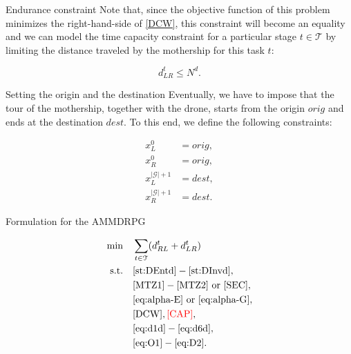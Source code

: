 \documentclass[slidestop,usepdftitle=false,10pt]{beamer}
\begin{document}
	\begin{frame}{Endurance constraint}
    	Note that, since the objective function of this problem minimizes the right-hand-side of \eqref{DCW}, this constraint will become an equality and we can model the time capacity constraint for a particular stage $t\in \mathcal T$ by limiting the distance traveled by the mothership for this task $t$:
    
    {\color{red}
    \begin{equation}\tag{Capacity}\label{CAP}
        d_{LR}^t \leq N^d.
    \end{equation}}
	    
	\end{frame}
	\begin{frame}{Setting the origin and the destination}
	    Eventually, we have to impose that the tour of the mothership, together with the drone, starts from the origin $orig$ and ends at the destination $dest$. To this end, we define the following constraints:

        \begin{align*}
        x_L^0 & =  orig,  \tag{ORIG$_1$} \label{eq:O1} \\
        x_R^0 & =  orig,  \tag{ORIG$_2$} \label{eq:O2} \\
        x_L^{|\mathcal{G}|+1} & =  dest,  \tag{DEST$_1$} \label{eq:D1} \\
        x_R^{|\mathcal{G}|+1} & =  dest.  \tag{DEST$_2$} \label{eq:D2} 
        \end{align*}

	\end{frame}
	
	\begin{frame}{Formulation for the AMMDRPG}
	
	\begin{align*}
	    \text{min}\quad & \sum_{t\in \mathcal T} (d_{RL}^t + d_{LR}^t) \\
	    \text{s.t.}\quad & \eqref{st:DEntd}-\eqref{st:DInvd}, \\
	    & \eqref{MTZ1} - \eqref{MTZ2} \text{ or } \eqref{SEC}, \\
	    & \eqref{eq:alpha-E} \text{ or } \eqref{eq:alpha-G}, \\
	    & \eqref{DCW}, \textcolor{red}{\eqref{CAP}}, \\
	    & \eqref{eq:d1d}-\eqref{eq:d6d}, \\
	    & \eqref{eq:O1}-\eqref{eq:D2}.
	\end{align*}
	\end{frame}
	
\end{document}
